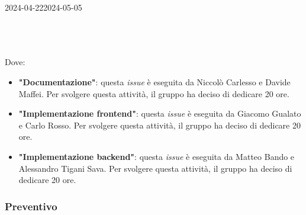 \begin{ganttchart}[
		x unit=0.6cm, %
		y unit chart=0.6cm,
		bar/.style={fill=blue!50},
		bar height=0.5,
		time slot format=isodate,
		time slot unit=day,
		vgrid,
		today=2024-04-22,
		today rule/.style={draw=red, ultra thick}
	]{2024-04-22}{2024-05-05}
	 \\
	 \\
	 \\
	 \\
\end{ganttchart}

Dove:
\begin{itemize}
	\item \textbf{"Documentazione"}: questa \textit{issue} è eseguita da Niccolò Carlesso e Davide Maffei. Per svolgere questa attività, il gruppo ha deciso di dedicare 20 ore.
	\item \textbf{"Implementazione frontend"}: questa \textit{issue} è eseguita da Giacomo Gualato e Carlo Rosso. Per svolgere questa attività, il gruppo ha deciso di dedicare 20 ore.
	\item \textbf{"Implementazione backend"}: questa \textit{issue} è eseguita da Matteo Bando e Alessandro Tigani Sava. Per svolgere questa attività, il gruppo ha deciso di dedicare 20 ore.
\end{itemize}

\subsubsection{Preventivo}

